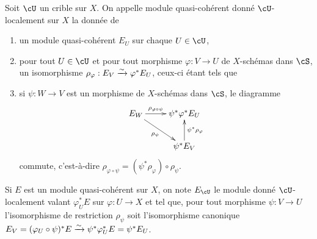 \subsubsection{}\label{I:1-4-4}

Soit $\cU$ un crible sur $X$. On appelle module quasi-cohérent donné 
$\cU$-localement sur $X$ la donnée de 
\begin{enumerate}[\indent a)]
  \item un module quasi-cohérent $E_U$ sur chaque $U\in\cU$, 
  \item pour tout $U\in\cU$ et pour tout morphisme $\varphi:V\to U$ de 
    $X$-schémas dans $\cS$, un isomorphisme 
    $\rho_\varphi:E_V\xrightarrow\sim \varphi^* E_U$, ceux-ci étant tels que 
  \item si $\psi:W\to V$ est un morphisme de $X$-schémas dans $\cS$, le 
    diagramme 
    \[\xymatrix{
      E_W \ar[r]^-{\rho_{\varphi\circ\psi}} \ar[dr]_-{\rho_\psi} 
        & \psi^*\varphi^* E_U \\
      & \psi^* E_V \ar[u]_-{\psi^*\rho_\varphi}
    }\]
    commute, c'est-à-dire 
    $\rho_{\varphi\circ\psi}=(\psi^*\rho_\varphi)\circ \rho_\psi$. 
\end{enumerate}

Si $E$ est un module quasi-cohérent sur $X$, on note $E_\cU$ le module 
donné $\cU$-localement valant $\varphi_U^* E$ sur $\varphi:U\to X$ et tel que, 
pour tout morphisme $\psi:V\to U$ l'isomorphisme de restriction $\rho_\psi$ 
soit l'isomorphisme canonique 
$E_V=(\varphi_U\circ \psi)^* E\xrightarrow\sim \psi^* \varphi_U^* E = \psi^* E_U$. 


